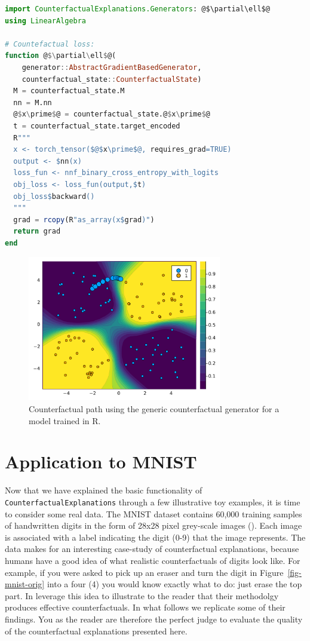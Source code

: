 \documentclass{juliacon}
\begin{document}
\begin{lstlisting}[language=Julia, escapechar=@]
import CounterfactualExplanations.Generators: @$\partial\ell$@
using LinearAlgebra

# Countefactual loss:
function @$\partial\ell$@(
    generator::AbstractGradientBasedGenerator, 
    counterfactual_state::CounterfactualState) 
  M = counterfactual_state.M
  nn = M.nn
  @$x\prime$@ = counterfactual_state.@$x\prime$@
  t = counterfactual_state.target_encoded
  R"""
  x <- torch_tensor($@$x\prime$@, requires_grad=TRUE)
  output <- $nn(x)
  loss_fun <- nnf_binary_cross_entropy_with_logits
  obj_loss <- loss_fun(output,$t)
  obj_loss$backward()
  """
  grad = rcopy(R"as_array(x$grad)")
  return grad
end
\end{lstlisting}

\begin{figure}

{\centering \includegraphics[width=3.33333in,height=2.5in]{www/ce_torch.png}

}

\caption{\label{fig-torch}Counterfactual path using the generic
counterfactual generator for a model trained in R.}

\end{figure}

\hypertarget{sec-emp}{%
\section{Application to MNIST}\label{sec-emp}}

Now that we have explained the basic functionality of
\texttt{CounterfactualExplanations} through a few illustrative toy
examples, it is time to consider some real data. The MNIST dataset
contains 60,000 training samples of handwritten digits in the form of
28x28 pixel grey-scale images (\cite{lecun1998mnist}). Each image is
associated with a label indicating the digit (0-9) that the image
represents. The data makes for an interesting case-study of
counterfactual explanations, because humans have a good idea of what
realistic counterfactuals of digits look like. For example, if you were
asked to pick up an eraser and turn the digit in
Figure~\ref{fig-mnist-orig} into a four (4) you would know exactly what
to do: just erase the top part. In \cite{schut2021generating} leverage
this idea to illustrate to the reader that their methodolgy produces
effective counterfactuals. In what follows we replicate some of their
findings. You as the reader are therefore the perfect judge to evaluate
the quality of the counterfactual explanations presented here.
\end{document}
